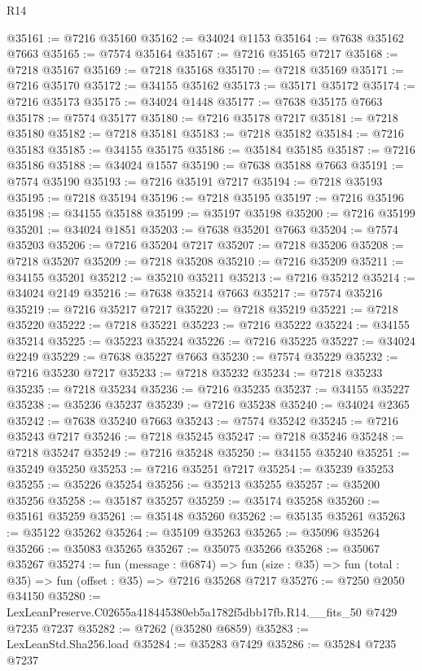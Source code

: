 \begin{lexlean}{R14}
\begin{coremodule}
@35161 := @7216 @35160
@35162 := @34024 @1153
@35164 := @7638 @35162 @7663
@35165 := @7574 @35164
@35167 := @7216 @35165 @7217
@35168 := @7218 @35167
@35169 := @7218 @35168
@35170 := @7218 @35169
@35171 := @7216 @35170
@35172 := @34155 @35162
@35173 := @35171 @35172
@35174 := @7216 @35173
@35175 := @34024 @1448
@35177 := @7638 @35175 @7663
@35178 := @7574 @35177
@35180 := @7216 @35178 @7217
@35181 := @7218 @35180
@35182 := @7218 @35181
@35183 := @7218 @35182
@35184 := @7216 @35183
@35185 := @34155 @35175
@35186 := @35184 @35185
@35187 := @7216 @35186
@35188 := @34024 @1557
@35190 := @7638 @35188 @7663
@35191 := @7574 @35190
@35193 := @7216 @35191 @7217
@35194 := @7218 @35193
@35195 := @7218 @35194
@35196 := @7218 @35195
@35197 := @7216 @35196
@35198 := @34155 @35188
@35199 := @35197 @35198
@35200 := @7216 @35199
@35201 := @34024 @1851
@35203 := @7638 @35201 @7663
@35204 := @7574 @35203
@35206 := @7216 @35204 @7217
@35207 := @7218 @35206
@35208 := @7218 @35207
@35209 := @7218 @35208
@35210 := @7216 @35209
@35211 := @34155 @35201
@35212 := @35210 @35211
@35213 := @7216 @35212
@35214 := @34024 @2149
@35216 := @7638 @35214 @7663
@35217 := @7574 @35216
@35219 := @7216 @35217 @7217
@35220 := @7218 @35219
@35221 := @7218 @35220
@35222 := @7218 @35221
@35223 := @7216 @35222
@35224 := @34155 @35214
@35225 := @35223 @35224
@35226 := @7216 @35225
@35227 := @34024 @2249
@35229 := @7638 @35227 @7663
@35230 := @7574 @35229
@35232 := @7216 @35230 @7217
@35233 := @7218 @35232
@35234 := @7218 @35233
@35235 := @7218 @35234
@35236 := @7216 @35235
@35237 := @34155 @35227
@35238 := @35236 @35237
@35239 := @7216 @35238
@35240 := @34024 @2365
@35242 := @7638 @35240 @7663
@35243 := @7574 @35242
@35245 := @7216 @35243 @7217
@35246 := @7218 @35245
@35247 := @7218 @35246
@35248 := @7218 @35247
@35249 := @7216 @35248
@35250 := @34155 @35240
@35251 := @35249 @35250
@35253 := @7216 @35251 @7217
@35254 := @35239 @35253
@35255 := @35226 @35254
@35256 := @35213 @35255
@35257 := @35200 @35256
@35258 := @35187 @35257
@35259 := @35174 @35258
@35260 := @35161 @35259
@35261 := @35148 @35260
@35262 := @35135 @35261
@35263 := @35122 @35262
@35264 := @35109 @35263
@35265 := @35096 @35264
@35266 := @35083 @35265
@35267 := @35075 @35266
@35268 := @35067 @35267
@35274 := fun (message : @6874) =>
  fun (size : @35) => fun (total : @35) => fun (offset : @35) => @7216 @35268 @7217
@35276 := @7250 @2050 @34150
@35280 := LexLeanPreserve.C02655a418445380eb5a1782f5dbb17fb.R14.__fits_50 @7429 @7235 @7237
@35282 := @7262 (@35280 @6859)
@35283 := LexLeanStd.Sha256.load
@35284 := @35283 @7429
@35286 := @35284 @7235 @7237

\end{coremodule}
\end{lexlean}

